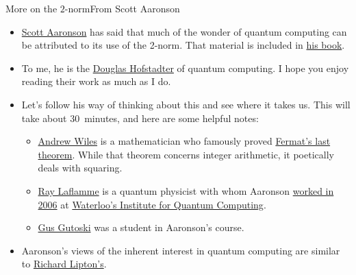 \begin{frame}{More on the $2$-norm}{From Scott Aaronson}

\begin{itemize}
\item 
\href{https://scottaaronson.com/}{Scott Aaronson} has said that much of the wonder of quantum computing can be attributed to its use of the 2-norm.  That material is included in \href{https://www.amazon.com/Quantum-Computing-since-Democritus-Aaronson/dp/0521199565}{his book}.  

\item To me, he is the \href{https://en.wikipedia.org/wiki/Douglas_Hofstadter}{Douglas Hofstadter} of quantum computing.  I hope you enjoy reading their work as much as I do.
\item 
Let's follow his way of thinking about this  and see where it takes us.  This will take \alert{about 30~minutes}, and here are some helpful notes:
\begin{itemize}
    \item \href{https://en.wikipedia.org/wiki/Andrew_Wiles}{Andrew Wiles} is a mathematician who famously proved \href{https://en.wikipedia.org/wiki/Fermat\%27s_Last_Theorem}{Fermat's last theorem}. While that theorem concerns integer arithmetic, it poetically deals with squaring.
    \item \href{https://en.wikipedia.org/wiki/Raymond_Laflamme}{Ray Laflamme} is a quantum physicist with whom Aaronson \href{https://news.ycombinator.com/item?id=23621425}{worked in 2006} at \href{https://uwaterloo.ca/institute-for-quantum-computing/}{Waterloo's Institute for Quantum Computing}.
    \item \href{https://www.linkedin.com/in/ggutoski/}{Gus Gutoski} was a student in Aaronson's course.
\end{itemize}
\item Aaronson's views of the inherent interest in quantum computing are similar to \href{https://mitpress.mit.edu/contributors/richard-j-lipton}{Richard Lipton's}.
\end{itemize}

\end{frame}


